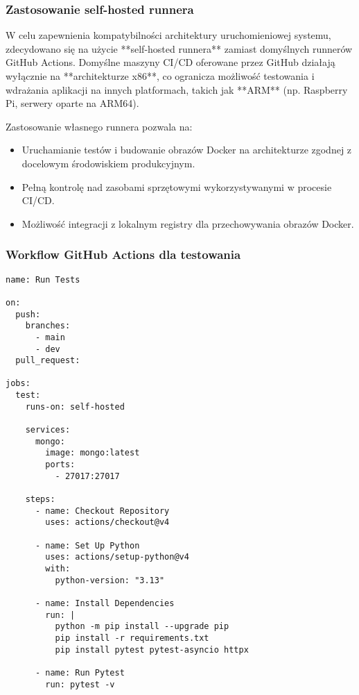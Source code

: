 \subsubsection{Zastosowanie self-hosted runnera}

W celu zapewnienia kompatybilności architektury uruchomieniowej systemu, zdecydowano się na użycie **self-hosted runnera** zamiast domyślnych runnerów GitHub Actions. Domyślne maszyny CI/CD oferowane przez GitHub działają wyłącznie na **architekturze x86**, co ogranicza możliwość testowania i wdrażania aplikacji na innych platformach, takich jak **ARM** (np. Raspberry Pi, serwery oparte na ARM64). 

Zastosowanie własnego runnera pozwala na:
\begin{itemize}
    \item Uruchamianie testów i budowanie obrazów Docker na architekturze zgodnej z docelowym środowiskiem produkcyjnym.
    \item Pełną kontrolę nad zasobami sprzętowymi wykorzystywanymi w procesie CI/CD.
    \item Możliwość integracji z lokalnym registry dla przechowywania obrazów Docker.
\end{itemize}

\subsubsection{Workflow GitHub Actions dla testowania}

\begin{verbatim}
name: Run Tests

on:
  push:
    branches:
      - main
      - dev
  pull_request:

jobs:
  test:
    runs-on: self-hosted

    services:
      mongo:
        image: mongo:latest
        ports:
          - 27017:27017

    steps:
      - name: Checkout Repository
        uses: actions/checkout@v4

      - name: Set Up Python
        uses: actions/setup-python@v4
        with:
          python-version: "3.13"

      - name: Install Dependencies
        run: |
          python -m pip install --upgrade pip
          pip install -r requirements.txt
          pip install pytest pytest-asyncio httpx

      - name: Run Pytest
        run: pytest -v
\end{verbatim}

